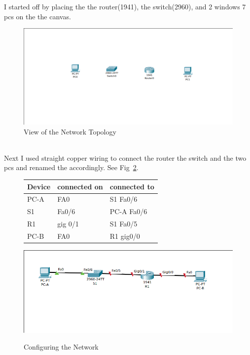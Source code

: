 \documentclass[../EngineeringJournal_CDavis.tex]{subfiles}
\begin{document}
\newpage


I started off by placing the the router(1941), the switch(2960), and 2 windows 7 pcs on the the canvas.


\begin{figure}[!hbt]
  \centering
  \includegraphics[width=.45\linewidth]{Figures/2020-01-28-090220_966x444_scrot.png}
  \caption{View of the Network Topology}
  \label{Topo1}
\end{figure}

\noindent{}
\\Next I used straight copper wiring to connect the router the switch and the two pcs
and renamed the accordingly. See Fig~\ref{netconfig1}.

\begin{figure}[!hbt]
  \begin{minipage}[c]{0.4\linewidth}
    \centering
    \begin{tabular}{|l|l|l|}
        Device & connected on & connected to \\
        \hline
        PC-A & FA0 & S1 Fa0/6 \\
        S1 & Fa0/6 & PC-A Fa0/6 \\
        R1 & gig 0/1 & S1 Fa0/5 \\
        PC-B & FA0 & R1 gig0/0 
    \end{tabular}
    \label{netconfig1table1}
  \end{minipage}\hfill
  \begin{minipage}[c]{0.4\linewidth}
    \centering
    \includegraphics[scale=0.3]{Figures/2020-01-28-092436_700x276_scrot.png}
    \label{netconfig1scrot1}
  \end{minipage}
  \caption{Configuring the Network}\label{netconfig1}
\end{figure}
\end{document}
